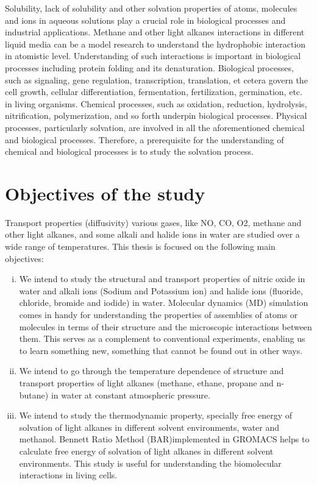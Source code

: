 Solubility, lack of solubility and other solvation properties of atoms, molecules and ions in aqueous
solutions play a crucial role in biological processes and industrial applications. Methane and other light alkanes  interactions in different liquid media can be a model research to understand the hydrophobic interaction in atomistic level. Understanding of such interactions is important in biological processes including protein folding and its denaturation. Biological processes, such as signaling, gene regulation, transcription, translation, et cetera govern the cell growth, cellular differentiation, fermentation, fertilization, germination, etc. in living organisms. Chemical processes, such as oxidation, reduction, hydrolysis, nitrification, polymerization, and so forth underpin biological processes. Physical processes, particularly solvation, are involved in all the aforementioned chemical and biological processes. Therefore, a prerequisite for the understanding of chemical and biological processes is to study the solvation process.

\section{Objectives of the study}
Transport  properties (diffusivity)  various gases, like NO, CO, O2,  methane and other light alkanes, and some alkali and halide ions in water are studied  over a wide range of temperatures. This thesis is focused on the following main  objectives:

\begin{enumerate}[(i)]
\item We intend  to study the structural and transport properties of nitric oxide in water and alkali ions (Sodium  and Potassium ion) and halide ions (fluoride, chloride, bromide and iodide) in water. Molecular dynamics (MD) simulation comes in handy for understanding the properties of assemblies of atoms or molecules in terms of their structure and the microscopic interactions between
them. This serves as a complement to conventional experiments, enabling us to learn
something new, something that cannot be found out in other ways. 

\item We intend to go through the temperature dependence of structure and   transport properties of light alkanes (methane, ethane, propane and n-butane) in water at constant atmospheric pressure.   

\item We intend to study  the thermodynamic property,  specially free energy of solvation of light alkanes in  different solvent environments,  water and methanol. Bennett Ratio Method (BAR)implemented  in GROMACS helps to calculate free energy of solvation of light alkanes in different solvent environments. This study is useful for understanding the biomolecular interactions in living cells. 
\end{enumerate}
